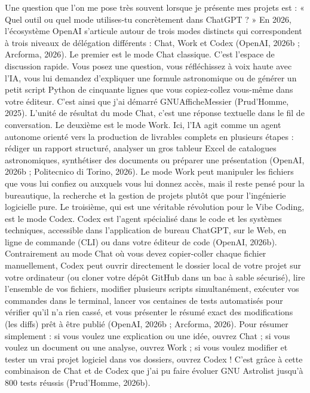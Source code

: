 \documentclass[10pt,letterpaper]{article}
\begin{document}
Une question que l'on me pose très souvent lorsque je présente mes projets est : « Quel outil ou quel mode utilises-tu concrètement dans ChatGPT ? » En 2026, l'écosystème OpenAI s'articule autour de trois modes distincts qui correspondent à trois niveaux de délégation différents : Chat, Work et Codex (OpenAI, 2026b ; Arcforma, 2026). Le premier est le mode Chat classique. C'est l'espace de discussion rapide. Vous posez une question, vous réfléchissez à voix haute avec l'IA, vous lui demandez d'expliquer une formule astronomique ou de générer un petit script Python de cinquante lignes que vous copiez-collez vous-même dans votre éditeur. C'est ainsi que j'ai démarré GNUAfficheMessier (Prud'Homme, 2025). L'unité de résultat du mode Chat, c'est une réponse textuelle dans le fil de conversation. Le deuxième est le mode Work. Ici, l'IA agit comme un agent autonome orienté vers la production de livrables complets en plusieurs étapes : rédiger un rapport structuré, analyser un gros tableur Excel de catalogues astronomiques, synthétiser des documents ou préparer une présentation (OpenAI, 2026b ; Politecnico di Torino, 2026). Le mode Work peut manipuler les fichiers que vous lui confiez ou auxquels vous lui donnez accès, mais il reste pensé pour la bureautique, la recherche et la gestion de projets plutôt que pour l'ingénierie logicielle pure. Le troisième, qui est une véritable révolution pour le Vibe Coding, est le mode Codex. Codex est l'agent spécialisé dans le code et les systèmes techniques, accessible dans l'application de bureau ChatGPT, sur le Web, en ligne de commande (CLI) ou dans votre éditeur de code (OpenAI, 2026b). Contrairement au mode Chat où vous devez copier-coller chaque fichier manuellement, Codex peut ouvrir directement le dossier local de votre projet sur votre ordinateur (ou cloner votre dépôt GitHub dans un bac à sable sécurisé), lire l'ensemble de vos fichiers, modifier plusieurs scripts simultanément, exécuter vos commandes dans le terminal, lancer vos centaines de tests automatisés pour vérifier qu'il n'a rien cassé, et vous présenter le résumé exact des modifications (les diffs) prêt à être publié (OpenAI, 2026b ; Arcforma, 2026). Pour résumer simplement : si vous voulez une explication ou une idée, ouvrez Chat ; si vous voulez un document ou une analyse, ouvrez Work ; si vous voulez modifier et tester un vrai projet logiciel dans vos dossiers, ouvrez Codex ! C'est grâce à cette combinaison de Chat et de Codex que j'ai pu faire évoluer GNU Astrolist jusqu'à 800 tests réussis (Prud'Homme, 2026b).\par
\end{document}
